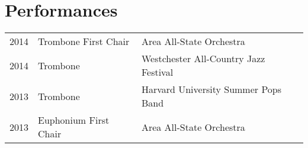 \documentclass[letterpaper]{deedy-resume} %
\begin{document}
\begin{minipage}[t]{0.58\textwidth}
\section{Performances} 

\begin{tabular}{rll}
2014 & Trombone First Chair & Area All-State Orchestra \\
2014 & Trombone & Westchester All-Country Jazz Festival \\
2013 & Trombone & Harvard University Summer Pops Band \\
2013 & Euphonium First Chair & Area All-State Orchestra \\
\end{tabular}



\end{minipage} %








\end{document}
